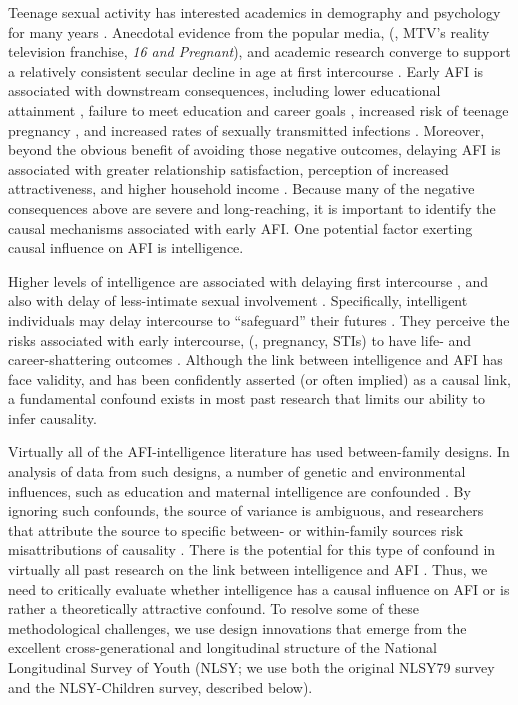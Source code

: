 Teenage sexual activity has interested academics in demography and psychology for many years \citep{Brooks-Gunn1989,kinsey1948sexual,santelli2000adolescent}. Anecdotal evidence from the popular media, (\eg, MTV's reality television franchise, \textit{16 and Pregnant}\nocite{mtv}), 
and academic research converge to support a relatively consistent secular decline in age at first intercourse  \citep[AFI; see][]{bozon2003,finer2007trends,Kann2014}. Early AFI is associated with downstream consequences, including lower educational attainment \citep{Harden2012,Spriggs2008,Wellings2001}, failure to meet education and career goals \citep{halpern2000smart}, increased risk of teenage pregnancy \citep{Leitenberg2000,Wellings2001}, and increased rates of sexually transmitted infections \citep[STIs;][]{kaestle2005young}. Moreover, beyond the obvious benefit of avoiding those negative outcomes, delaying AFI is associated with greater relationship satisfaction, perception of increased attractiveness, and higher household income \citep{Harden2012}. Because many of the negative consequences above are severe and long-reaching, it is important to identify the causal mechanisms associated with early AFI. One potential factor exerting causal influence on AFI is intelligence.

Higher levels of intelligence are associated with delaying first intercourse \citep{halpern2000smart,mott1983early,Paul2000,Woodward2001}, and also with delay of less-intimate sexual involvement \citep{halpern2000smart}. Specifically, intelligent individuals may delay intercourse to ``safeguard'' their futures \citep{kirby2002effective, manlove1998influence, raffaelli2003sexual}. They perceive the risks associated with early intercourse, (\eg, pregnancy, STIs) to have life- and career-shattering outcomes \citep{halpern2000smart,harden2011don}. Although the link between intelligence and AFI has face validity, and has been confidently asserted (or often implied) as a causal link, a fundamental confound exists in most past research that limits our ability to infer causality.

Virtually all of the AFI-intelligence literature has used between-family designs. In analysis of data from such designs, a number of genetic and environmental influences, such as education and maternal intelligence are confounded \citep{DOnofrio2013,harden2014genetic,Lahey2010,Rodgers2000}. By ignoring such confounds, the source of variance is ambiguous, and researchers that attribute the source to specific between- or within-family sources risk misattributions of causality \citep{Rowe1997,Rutter2007}. There is the potential for this type of confound in virtually all past research on the link between intelligence and AFI \citep{harden2011don,harden2014genetic,plomin2004intelligence,rodgers1999nature,rodgers1994df}. Thus, we need to critically evaluate whether intelligence has a causal influence on AFI or is rather a theoretically attractive confound. To resolve some of these methodological challenges, we use design innovations that emerge from the excellent cross-generational and longitudinal structure of the National Longitudinal Survey of Youth (NLSY; we use both the original NLSY79 survey and the NLSY-Children survey, described below).
%
